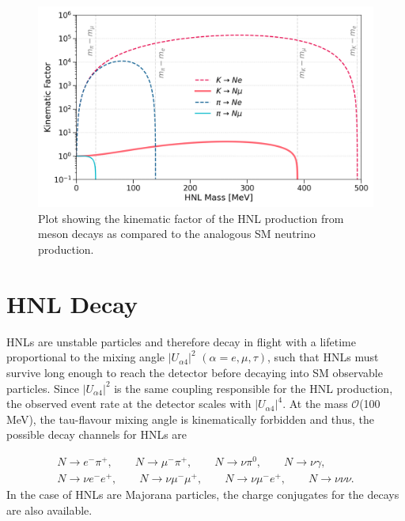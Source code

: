 
\begin{figure}[t] 
\centering    
\includegraphics[width=1.0\textwidth]{kinematics_factor}
\caption[KinematicsFactor]{
Plot showing the kinematic factor of the HNL production from meson decays as compared to the analogous SM neutrino production.
}
\label{fig:KinematicsFactor}
\end{figure}

\section{HNL Decay}
\label{sec2Decay}

HNLs are unstable particles and therefore decay in flight with a lifetime proportional to the mixing angle $|U_{\alpha4}|^{2}$ $(\alpha=e,\mu,\tau)$, such that HNLs must survive long enough to reach the detector before decaying into SM observable particles.
Since $|U_{\alpha4}|^{2}$ is the same coupling responsible for the HNL production, the observed event rate at the detector scales with $|U_{\alpha4}|^{4}$.
At the mass $\mathcal{O}$(100 MeV), the tau-flavour mixing angle is kinematically forbidden and thus, the possible decay channels for HNLs are \cite{SBNHNL}

\begin{equation}
\begin{split}
	N\rightarrow e^{-}\pi^{+},\qquad 
	N\rightarrow \mu^{-}\pi^{+},\qquad
	N\rightarrow \nu \pi^{0},\qquad 
	N\rightarrow \nu \gamma,\qquad \\ 
	N\rightarrow \nu e^{-} e^{+},\qquad 
	N\rightarrow \nu \mu^{-} \mu^{+},\qquad 
	N\rightarrow \nu \mu^{-}e^{+},\qquad
	N\rightarrow \nu \nu \nu. 
\end{split}
\end{equation}
In the case of HNLs are Majorana particles, the charge conjugates for the decays are also available.

